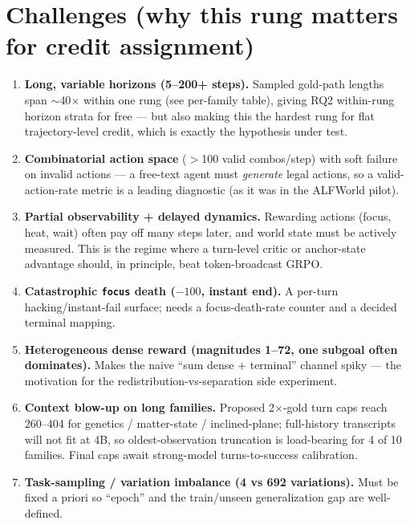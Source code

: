 \documentclass[10pt]{article}
\newcommand{\cmd}[1]{\texttt{\small #1}}
\begin{document}
\section{Challenges (why this rung matters for credit assignment)}
\begin{enumerate}
\item \textbf{Long, variable horizons (5--200+ steps).} Sampled gold-path lengths span $\sim$40$\times$
within one rung (see per-family table), giving RQ2 within-rung horizon strata for free --- but also making
this the hardest rung for flat trajectory-level credit, which is exactly the hypothesis under test.
\item \textbf{Combinatorial action space} ($>$100 valid combos/step) with soft failure on invalid actions
--- a free-text agent must \emph{generate} legal actions, so a valid-action-rate metric is a leading
diagnostic (as it was in the ALFWorld pilot).
\item \textbf{Partial observability + delayed dynamics.} Rewarding actions (focus, heat, wait) often pay
off many steps later, and world state must be actively measured. This is the regime where a turn-level
critic or anchor-state advantage should, in principle, beat token-broadcast GRPO.
\item \textbf{Catastrophic \cmd{focus} death ($-100$, instant end).} A per-turn hacking/instant-fail
surface; needs a focus-death-rate counter and a decided terminal mapping.
\item \textbf{Heterogeneous dense reward (magnitudes 1--72, one subgoal often dominates).} Makes the naive
``sum dense + terminal'' channel spiky --- the motivation for the redistribution-vs-separation side
experiment.
\item \textbf{Context blow-up on long families.} Proposed 2$\times$-gold turn caps reach 260--404 for
genetics / matter-state / inclined-plane; full-history transcripts will not fit at 4B, so oldest-observation
truncation is load-bearing for 4 of 10 families. Final caps await strong-model turns-to-success calibration.
\item \textbf{Task-sampling / variation imbalance (4 vs 692 variations).} Must be fixed a priori so
``epoch'' and the train/unseen generalization gap are well-defined.
\end{enumerate}
\end{document}
